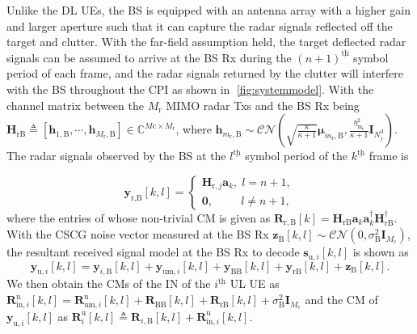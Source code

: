 \documentclass[9pt,journal]{IEEEtran}
\newcommand{\paren}[1]{\left({#1}\right)}
\newcommand{\bracket}[1]{{\left [{#1}\right ]}}
\newcommand{\ith}[1]    {{#1}^{\underline{\text{th}}}}
\newcommand{\rr}{_\mathrm{r}}
\newcommand{\cc}{_\mathrm{c}}
\newcommand{\B}{\textrm{B}}
\theoremstyle{definition}
\begin{document}
Unlike the DL UEs, the BS is equipped with an antenna array with a higher gain and larger aperture such that it can capture the radar signals reflected off the target and clutter. With the far-field assumption held, the target deflected radar signals can be assumed to arrive at the BS Rx during the $\ith{\paren{n+1}}$ symbol period of each frame, and the radar signals returned by the clutter will interfere with the BS throughout the CPI as shown in \figurename{$\;$\ref{fig:systemmodel}}. With the channel matrix between the $\mathit{M}\rr$ MIMO radar Txs and the BS Rx being $\mathbf{H}_{\textrm{rB}}\triangleq\bracket{\mathbf{h}_{1,\textrm{B}},\cdots,\mathbf{h}_{\mathit{M}\rr,\textrm{B}}}\in\mathbb{C}^{\mathit{M}\mathrm{c}\times \mathit{M}\rr}$, where $\mathbf{h}_{m\rr,\textrm{B}}\sim\mathcal{CN}\paren{\sqrt{\frac{\kappa}{\kappa+1}}\boldsymbol{\mu}_{m\rr,\textrm{B}},\frac{\eta^2_\mathrm{m\rr}}{\kappa+1}\mathbf{I}_{\mathit{N}^{\textrm{d}}_j}}$. The radar signals observed by the BS at the $\ith{l}$ symbol period of the $\ith{k}$ frame is\par\noindent\small
\begin{equation*}
    \mathbf{y}_{\textrm{r,B}}\bracket{k,l}=
    \begin{cases}
    \mathbf{H}_{\mathrm{r},j}\mathbf{a}_k, \;l=n+1,\\
    \mathbf{0}, \qquad~~ l\neq n+1,
    \end{cases}
\end{equation*}
\normalsize
where the entries of whose non-trivial CM is given as $\mathbf{R}_{\mathrm{r,B}}\bracket{k}=\mathbf{H}_{\textrm{rB}}\mathbf{a}_k\mathbf{a}^\dagger_k\mathbf{H}^\dagger_{\textrm{rB}}$. With the CSCG noise vector measured at the BS Rx $\mathbf{z}_\textrm{B}\bracket{k,l}\sim\mathcal{CN}\paren{0,\sigma^2_{\textrm{B}}\mathbf{I}_{M\cc}}$, the resultant received signal model at the BS Rx to decode $\mathbf{s}_{\textrm{u},i}\bracket{k,l}$ is shown as 
\begin{equation*}
    \mathbf{y}_{\textrm{u},i}\bracket{k,l}=\mathbf{y}_{i,\B}\bracket{k,l}+\mathbf{y}_{\textrm{um},i}\bracket{k,l}+\mathbf{y}_{\textrm{BB}}\bracket{k,l}+\mathbf{y}_{\textrm{rB}}\bracket{k,l}+\mathbf{z}_\textrm{B}\bracket{k,l}.
\end{equation*}
We then obtain the CMs of the IN of the $\ith{i}$ UL UE as $\mathbf{R}^\textrm{u}_{\mathrm{in},i}\bracket{k,l}=\mathbf{R}^\textrm{u}_{\textrm{um}, i}\bracket{k,l}+\mathbf{R}_{\mathrm{BB}}\bracket{k,l}+\mathbf{R}_{\textrm{rB}}\bracket{k,l}+\sigma^2_{\textrm{B}}\mathbf{I}_{\mathit{M}\cc}$ and the CM of $\mathbf{y}_{\textrm{u},i}\bracket{k,l}$ as $\mathbf{R}^\mathrm{u}_{i}\bracket{k,l}\triangleq\mathbf{R}_{i,\B}\bracket{k,l}+\mathbf{R}^\textrm{u}_{\mathrm{in},i}\bracket{k,l}$.  
\end{document}
